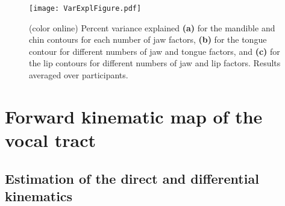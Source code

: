 \documentclass[preprint]{JASAnew}\usepackage[]{graphicx}\usepackage[]{color}
\begin{document}
\begin{figure}

\texttt{[image: VarExplFigure.pdf]}

\caption{(color online) Percent variance explained {\bf (a)} for the mandible and chin contours for each number of jaw factors, {\bf (b)} for the tongue contour for different numbers of jaw and tongue factors, and {\bf (c)} for the lip contours for different numbers of jaw and lip factors. Results averaged over participants.}
\label{fig:varexpl}
\end{figure}






\section{Forward kinematic map of the vocal tract}
\label{sec:forwardkinematicmap}

\subsection{Estimation of the direct and differential kinematics}
\end{document}
